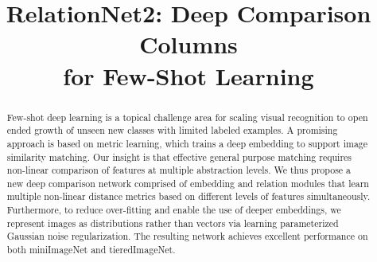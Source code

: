 \documentclass[conference]{IEEEtran}
\begin{document}
\title{RelationNet2: Deep Comparison Columns \\for Few-Shot Learning
}

\author{
\and

\and

\and

\hspace{3cm}
\and

}
\maketitle


\begin{abstract}
Few-shot deep learning is a topical challenge area for scaling visual recognition to open ended growth of unseen new classes with limited labeled examples. A promising approach is based on metric learning, which trains a deep embedding to support image similarity matching. Our insight is that effective general purpose matching requires non-linear comparison of features at multiple abstraction levels. We thus propose a new deep comparison network comprised of embedding and relation modules that learn multiple non-linear distance metrics based on different levels of features simultaneously. Furthermore, to reduce over-fitting and enable the use of deeper embeddings, we represent images as distributions rather than vectors via learning parameterized Gaussian noise regularization. The resulting network achieves excellent performance on both miniImageNet and tieredImageNet.
\end{abstract}
\end{document}
